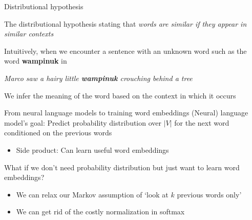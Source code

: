 \documentclass[12pt,aspectratio=169,handout]{beamer}
\begin{document}
\begin{frame}{Distributional hypothesis}

The distributional hypothesis stating that \emph{words are similar if they appear in similar contexts}

\begin{example}
Intuitively, when we encounter a sentence with an unknown word such as the word \textbf{wampinuk} in

\pause
\emph{Marco saw a hairy little \textbf{wampinuk} crouching behind a tree}

We infer the meaning of the word based on the context in which it occurs
\end{example}

\end{frame}


\begin{frame}{From neural language models to training word embeddings}
(Neural) language model's goal: Predict probability distribution over $|V|$ for the next word conditioned on the previous words

\begin{itemize}
	\item Side product: Can learn useful word embeddings
\end{itemize}

\pause
What if we don't need probability distribution but just want to learn word embeddings?
\begin{itemize}
	\item We can relax our Markov assumption of `look at $k$ previous words only'
	\item We can get rid of the costly normalization in softmax
\end{itemize}
	
\end{frame}
\end{document}
